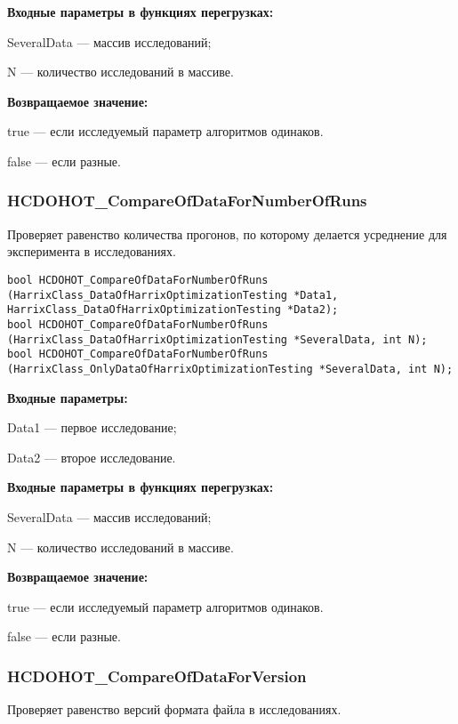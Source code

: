 \documentclass[a4paper,12pt]{article}
\begin{document}
\textbf{Входные параметры в функциях перегрузках:}

SeveralData --- массив исследований;
 
N --- количество исследований в массиве.

\textbf{Возвращаемое значение:}

true --- если исследуемый параметр алгоритмов одинаков.
 
false --- если разные.


\subsubsection{HCDOHOT\_CompareOfDataForNumberOfRuns}\label{HCDOHOT_CompareOfDataForNumberOfRuns}

Проверяет равенство количества прогонов, по которому делается усреднение для эксперимента в исследованиях.


\begin{lstlisting}[label=code_syntax_HCDOHOT_CompareOfDataForNumberOfRuns,caption=Синтаксис]
bool HCDOHOT_CompareOfDataForNumberOfRuns (HarrixClass_DataOfHarrixOptimizationTesting *Data1, HarrixClass_DataOfHarrixOptimizationTesting *Data2);
bool HCDOHOT_CompareOfDataForNumberOfRuns (HarrixClass_DataOfHarrixOptimizationTesting *SeveralData, int N);
bool HCDOHOT_CompareOfDataForNumberOfRuns (HarrixClass_OnlyDataOfHarrixOptimizationTesting *SeveralData, int N);
\end{lstlisting}

\textbf{Входные параметры:}

Data1 --- первое исследование;
 
Data2 --- второе исследование.
	 
\textbf{Входные параметры в функциях перегрузках:}

SeveralData --- массив исследований;
 
N --- количество исследований в массиве.

\textbf{Возвращаемое значение:}

true --- если исследуемый параметр алгоритмов одинаков.
 
false --- если разные.


\subsubsection{HCDOHOT\_CompareOfDataForVersion}\label{HCDOHOT_CompareOfDataForVersion}

Проверяет равенство версий формата файла в исследованиях.
\end{document}
